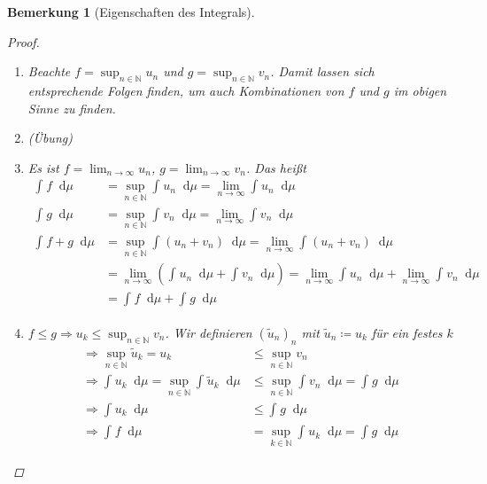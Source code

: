 \documentclass[11pt, twoside, a4paper]{article}
\theoremstyle{plain}
\newtheorem{bemerkung}[blockelement]{Bemerkung}
\numberwithin{equation}{subsection}
\newcommand{\pair}[1]{\left(#1\right)}
\newcommand{\impl}[0]{\Rightarrow{}}
\newcommand{\dif}{\mathop{}\!\mathrm{d}}
\newcommand{\toinf}{\to\infty}
\newcommand{\theoremescape}{\leavevmode}
\newcommand{\N}{\mathbb{N}}
\begin{document}
\begin{bemerkung}[Eigenschaften des Integrals]
        \begin{proof}
            \theoremescape
            \begin{enumerate}
                \item[(i)-(v)] Beachte $f = \sup_{n\in\N} u_n$ und $g = \sup_{n\in\N} v_n$. Damit lassen sich entsprechende Folgen finden, um auch Kombinationen von $f$ und $g$ im obigen Sinne zu finden.
                \item[(vi)] (Übung)
                \item[(vii)] Es ist $f = \lim_{n\toinf} u_n$, $g= \lim_{n\toinf} v_n$. Das heißt
                \begin{align*}
                    \int_{}^{} f \dif \mu &= \sup_{n\in\N} \int_{}^{} u_n \dif \mu = \lim_{n\toinf} \int_{}^{} u_n \dif \mu\\
                    \int_{}^{} g \dif \mu &= \sup_{n\in\N} \int_{}^{} v_n \dif \mu = \lim_{n\toinf} \int_{}^{} v_n \dif \mu\\
                    \int_{}^{} f+g \dif \mu &= \sup_{n\in\N} \int_{}^{} (u_n + v_n) \dif \mu = \lim_{n\toinf} \int_{}^{} (u_n + v_n) \dif \mu\\
                    &= \lim_{n\toinf} \pair{\int_{}^{} u_n \dif \mu + \int_{}^{} v_n \dif \mu} = \lim_{n\toinf} \int_{}^{} u_n \dif \mu + \lim_{n\toinf} \int_{}^{} v_n \dif \mu\\
                    &= \int_{}^{} f \dif \mu + \int_{}^{} g \dif \mu
                \end{align*}
                \item[(viii)] $f\leq g \impl u_k \leq \sup_{n\in\N} v_n$. Wir definieren $(\tilde{u}_n)_n$ mit $\tilde{u}_n \coloneqq u_k$ für ein festes $k$
                \begin{align*}
                    \impl \sup_{n\in\N} \tilde{u}_k = u_k &\leq \sup_{n\in\N} v_n\\
                    \impl \int_{}^{} u_k \dif \mu = \sup_{n\in\N} \int_{}^{} \tilde{u}_k \dif \mu &\leq \sup_{n\in\N} \int_{}^{} v_n \dif \mu = \int_{}^{} g \dif \mu\\
                    \impl \int_{}^{} u_k \dif \mu &\leq \int_{}^{} g \dif \mu\\
                    \impl \int_{}^{} f \dif \mu &= \sup_{k\in\N} \int_{}^{} u_k \dif \mu = \int_{}^{} g \dif \mu
                \end{align*}
            \end{enumerate}
        \end{proof}
    \end{bemerkung}
\end{document}
